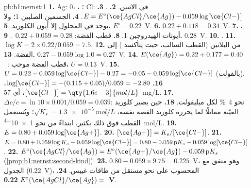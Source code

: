 \begin{solution}{pb:b1:nernst:1}
\textbf{1.} Ag: 0، ، ؛ Cl:  في الاثنين.
\textbf{2.} .
\textbf{3.} $E = E^\circ(\ce{AgCl}/\ce{Ag}) - 0.059\log[\ce{Cl-}]$.
\textbf{4.}  الجسمين الصلبين 1؛ ولا يوجد في المحلول إلا أيون
الكلوريد.
\textbf{5.} $E^\circ = 0.22$~V.
\textbf{6.} $0.22 + 0.118 = 0.34$~V.
\textbf{7.} ،  أيونات الهيدروجين 1.
\textbf{8.} قطب الفضة: $0.22 + 0.059 = 0.28$~.
\textbf{9.} $0.28$~V.
\textbf{10.} .
\textbf{11.} $\log K = 2 \times 0.22/0.059 = 7.5$.
\textbf{12.} من البلاتين (القطب السالب، حيث يتأكسد )
إلى الفضة.
\textbf{13.} $0.27 - 0.059\log 1.0 = 0.27$~V.
\textbf{14.} $E(\ce{Ag}) = 0.22 + 0.177 = 0.40$~: قطب الفضة
موجب، $U = 0.13$~V.
\textbf{15.} $U = 0.22 - 0.059\log[\ce{Cl-}] - 0.27 = -0.05 -
0.059\log[\ce{Cl-}]$ (بالفولت).
\textbf{16.} $\log[\ce{Cl-}] = -(0.115 + 0.05)/0.059 = -2.80$،
$[\ce{Cl-}] = \qty{1.6e-3}{mol/L}$، أي \qty{57}{mg/L}.
\textbf{17.} $\Delta c/c = \ln 10 \times 0.001/0.059 = 0.039$: نحو
\qty{4}{\percent} لكل ميليفولت.
\textbf{18.} حين يصير كلوريد العيّنة مماثلًا لما يحرره
كلوريد الفضة نفسه، $\sqrt{K_s} = \qty{1.3e-5}{mol/L}$؛
ويُستعمل القطب فوق ذلك بكثير، ابتداءً من نحو \qty{1e-4}{mol/L}.
\textbf{19.} $E = 0.80 + 0.059\log[\ce{Ag+}]$.
\textbf{20.} $[\ce{Ag+}] = K_s/[\ce{Cl-}]$.
\textbf{21.} $E = 0.80 + 0.059\log K_s - 0.059\log[\ce{Cl-}] = 0.80 -
0.059\,\mathrm{p}K_s - 0.059\log[\ce{Cl-}]$.
\textbf{22.} $E^\circ(\ce{AgCl}/\ce{Ag}) = E^\circ(\ce{Ag+}/\ce{Ag}) -
0.059\,\mathrm{p}K_s$ (\cref{prop:b1:nernst:second-kind}).
\textbf{23.} $0.80 - 0.059 \times 9.75 = 0.225$~V، وهو متفق مع
الجدول (0.22~V)، المحسوب على نحو مستقل من طاقات غيبس.
\textbf{24.} $E^\circ(\ce{AgCl}/\ce{Ag}) = $ \textbf{0.22~V}.
\end{solution}
